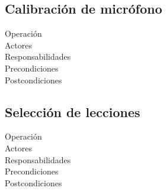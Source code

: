 \subsection{Calibración de micrófono}
\begin{description}
\item[Operación] 
\item[Actores]
\item[Responsabilidades]
\item[Precondiciones]
\item[Postcondiciones]
\end{description}

\subsection{Selección de lecciones}
\begin{description}
\item[Operación] 
\item[Actores]
\item[Responsabilidades]
\item[Precondiciones]
\item[Postcondiciones]
\end{description}


